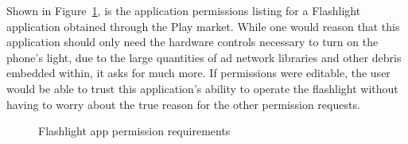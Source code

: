 Shown in Figure~\ref{fig:permission}, is the application permissions listing for a Flashlight application obtained through the Play market.  While one would reason that this application should only need the hardware controls necessary to turn on the phone's light, due to the large quantities of ad network libraries and other debris embedded within, it asks for much more.  If permissions were editable, the user would be able to trust this application’s ability to operate the flashlight without having to worry about the true reason for the other permission requests.  
\FloatBarrier
\begin{figure}[h!]
\centerline{}
\caption{Flashlight app permission requirements}
\label{fig:permission}
\end{figure}
